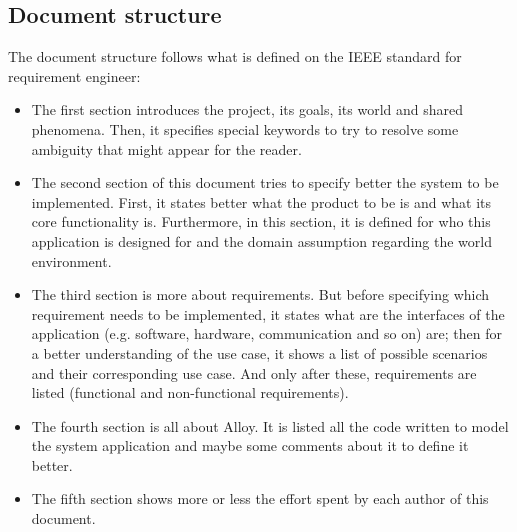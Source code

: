 \subsection{Document structure}
The document structure follows what is defined on the IEEE standard for requirement engineer:
\begin{itemize}
\item The first section introduces the project, its goals, its world and shared phenomena. Then, it specifies special keywords to try to resolve some ambiguity that might appear for the reader.
\item The second section of this document tries to specify better the system to be implemented. First, it states better what the product to be is and what its core functionality is. Furthermore, in this section, it is defined for who this application is designed for and the domain assumption regarding the world environment.
\item The third section is more about requirements. But before specifying which requirement needs to be implemented, it states what are the interfaces of the application (e.g. software, hardware, communication and so on) are; then for a better understanding of the use case, it shows a list of possible scenarios and their corresponding use case. And only after these, requirements are listed (functional and non-functional requirements).
\item The fourth section is all about Alloy. It is listed all the code written to model the system application and maybe some comments about it to define it better.
\item The fifth section shows more or less the effort spent by each author of this document.
\end{itemize}